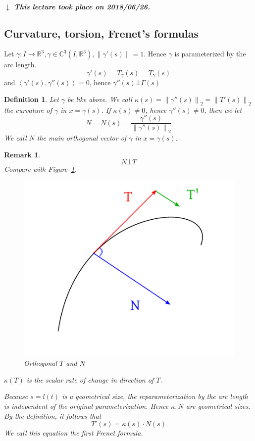 \documentclass{article}
\newtheorem{definition}{Definition}  \numberwithin{definition}{section}
\newtheorem{remark}{Remark}  \numberwithin{remark}{section}
\newcommand{\angel}[1]{\left\langle#1\right\rangle}
\newcommand{\norm}[1]{\left\|#1\right\|}
\newcommand{\dateref}[1]{%
  \begin{mdframed}[backgroundcolor=gray!10,innerbottommargin=0pt,innertopmargin=0pt]
    \paragraph{\textit{$\downarrow$ This lecture took place on #1.}}%
  \end{mdframed}%
}
\begin{document}
\dateref{2018/06/26}

\subsection{Curvature, torsion, Frenet's formulas}

Let $\gamma: I \to \mathbb R^3, \gamma \in \mathbb C^3(I, \mathbb R^3), \norm{\gamma'(s)} = 1$.
Hence $\gamma$ is parameterized by the arc length.
\[ \gamma'(s) = T_\gamma(s) = T_\gamma(s) \]
and $\angel{\gamma'(s), \gamma''(s)} = 0$, hence $\gamma''(s) \bot \Gamma(s)$

\begin{definition} %
  Let $\gamma$ be like above. We call $\kappa(s) = \norm{\gamma''(s)}_2 = \norm{T'(s)}_2$ \emph{the curvature of $\gamma$ in $x = \gamma(s)$}.
  If $\kappa(s) \neq 0$, hence $\gamma''(s) \neq 0$, then we let
  \[ N = N(s) = \frac{\gamma''(s)}{\norm{\gamma''(s)}_2} \]
  We call $N$ the \emph{main orthogonal vector of $\gamma$ in $x = \gamma(s)$}.
\end{definition}

\begin{remark}
  \[ N \bot T \]
  Compare with Figure~\ref{img:orthoTN}.
  \begin{figure}[t]
    \begin{center}
      \includegraphics{img/50_orthogonal.pdf}
      \caption{Orthogonal $T$ and $N$}
      \label{img:orthoTN}
    \end{center}
  \end{figure}
  $\kappa(T)$ is the scalar rate of change in direction of $T$.

  Because $s = l(t)$ is a geometrical size, the reparameterization by the arc length is independent of the original parameterization.
  Hence $\kappa, N$ are geometrical sizes. By the definition, it follows that
  \[ T'(s) = \kappa(s) \cdot N(s) \]
  We call this equation the \emph{first Frenet formula}.
\end{remark}
\end{document}
